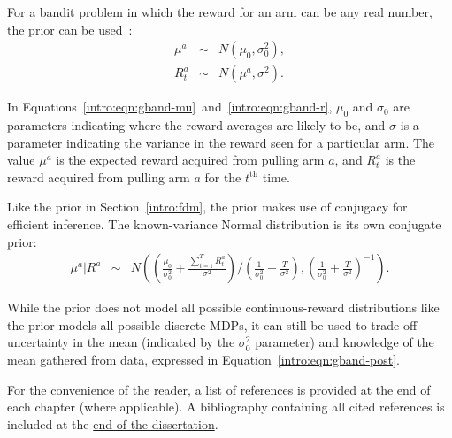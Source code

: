 For a bandit problem in which the reward for an arm can be any real number, the  prior can be used~\cite{wang05}:
\begin{eqnarray}
\label{intro:eqn:gband-mu}\mu^a &\sim& N(\mu_0, \sigma^2_0),\\
\label{intro:eqn:gband-r}R_t^a &\sim& N(\mu^a, \sigma^2).
\end{eqnarray}

In Equations~\ref{intro:eqn:gband-mu}~and~\ref{intro:eqn:gband-r}, $\mu_0$ and $\sigma_0$ are parameters indicating where the reward averages are likely to be, and $\sigma$ is a parameter indicating the variance in the reward seen for a particular arm. The value $\mu^a$ is the expected reward acquired from pulling arm $a$, and $R_t^a$ is the reward acquired from pulling arm $a$ for the $t^{\mbox{th}}$ time.

Like the  prior in Section~\ref{intro:fdm}, the  prior makes use of conjugacy for efficient inference. The known-variance Normal distribution is its own conjugate prior:
\begin{eqnarray}
\label{intro:eqn:gband-post}\mu^a|R^a &\sim& N\left(\left(\frac{\mu_0}{\sigma_0^2} + \frac{\sum_{t=1}^T R_t^a}{\sigma^2}\right)/\left(\frac 1 {\sigma_0^2} + \frac T {\sigma^2} \right), \left(\frac 1 {\sigma_0^2} + \frac T {\sigma^2} \right)^{-1}\right).
\end{eqnarray}

While the  prior does not model all possible continuous-reward distributions like the  prior models all possible discrete MDPs, it can still be used to trade-off uncertainty in the mean (indicated by the $\sigma_0^2$ parameter) and knowledge of the mean gathered from data, expressed in Equation~\ref{intro:eqn:gband-post}.



%
\ifperchapterbib%
For the convenience of the reader, a list of references is provided at the end of each chapter (where applicable).
\ifendbib%
A bibliography containing all cited references is included at the \hyperref[sec:bibliography]{end of the dissertation}.
\else\fi%
\cbend%
\else\fi%